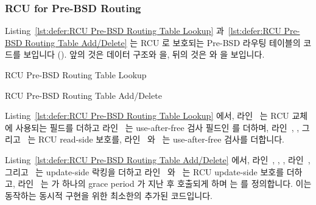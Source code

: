 \fi

\subsubsection{RCU for Pre-BSD Routing}
\label{sec:defer:RCU for Pre-BSD Routing}

Listing~\ref{lst:defer:RCU Pre-BSD Routing Table Lookup}
과~\ref{lst:defer:RCU Pre-BSD Routing Table Add/Delete}
는 RCU 로 보호되는 Pre-BSD 라우팅 테이블의 코드를 보입니다
().
앞의 것은 데이터 구조와  을, 뒤의 것은  와
 을 보입니다.

\begin{listing}[tbp]

\caption{RCU Pre-BSD Routing Table Lookup}
\label{lst:defer:RCU Pre-BSD Routing Table Lookup}
\end{listing}

\begin{listing}[tbp]

\caption{RCU Pre-BSD Routing Table Add/Delete}
\label{lst:defer:RCU Pre-BSD Routing Table Add/Delete}
\end{listing}

\begin{fcvref}
Listing~\ref{lst:defer:RCU Pre-BSD Routing Table Lookup} 에서, 라인~
는 RCU 교체에 사용되는  필드를 더하고 라인~ 는
use-after-free 검사 필드인  를 더하며, 라인~,
, 그리고~ 는 RCU read-side 보호를,
라인~ 와~ 는 use-after-free 검사를 더합니다.
\end{fcvref}
\begin{fcvref}
Listing~\ref{lst:defer:RCU Pre-BSD Routing Table Add/Delete} 에서,
라인~, , ,
라인~, 그리고~ 는 update-side 락킹을
더하고 라인~ 와~ 는 RCU update-side
보호를 더하고, 라인~  는  가 하나의 grace
period 가 지난 후 호출되게 하며  는  를
정의합니다.
이는 동작하는 동시적 구현을 위한 최소한의 추가된 코드입니다.
\end{fcvref}

